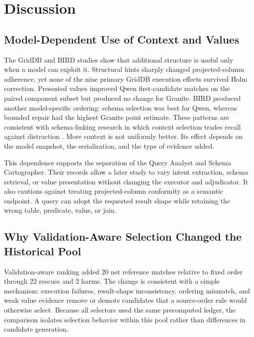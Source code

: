\documentclass[applsci,article,submit,moreauthors]{Definitions/mdpi}
\begin{document}
\section{Discussion}

\subsection{Model-Dependent Use of Context and Values}

The GridDB and BIRD studies show that additional structure is useful only when a model can exploit it. Structural hints sharply changed projected-column adherence, yet none of the nine primary GridDB execution effects survived Holm correction. Presented values improved Qwen first-candidate matches on the paired component subset but produced no change for Granite. BIRD produced another model-specific ordering: schema selection was best for Qwen, whereas bounded repair had the highest Granite point estimate. These patterns are consistent with schema-linking research in which context selection trades recall against distraction \cite{bozdemir2026schema,liu2025solidsql,hao2025genlink}. More context is not uniformly better. Its effect depends on the model snapshot, the serialization, and the type of evidence added.

This dependence supports the separation of the Query Analyst and Schema Cartographer. Their records allow a later study to vary intent extraction, schema retrieval, or value presentation without changing the executor and adjudicator. It also cautions against treating projected-column conformity as a semantic endpoint. A query can adopt the requested result shape while retaining the wrong table, predicate, value, or join.

\subsection{Why Validation-Aware Selection Changed the Historical Pool}

Validation-aware ranking added 20 net reference matches relative to fixed order through 22 rescues and 2 harms. The change is consistent with a simple mechanism: execution failures, result-shape inconsistency, ordering mismatch, and weak value evidence remove or demote candidates that a source-order rule would otherwise select. Because all selectors used the same precomputed ledger, the comparison isolates selection behavior within this pool rather than differences in candidate generation.
\end{document}
